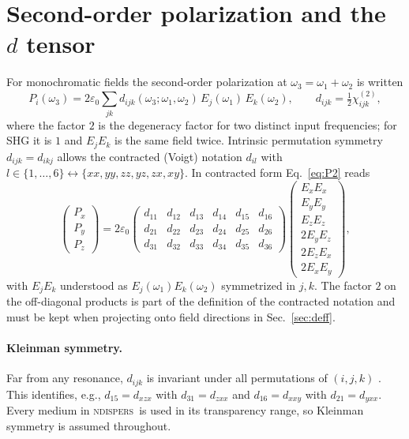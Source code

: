 \documentclass[aps,pra,preprint,amsmath,amssymb,nofootinbib,superscriptaddress]{revtex4-2}
\newcommand{\ndispers}{\textsc{ndispers}}
\begin{document}
\section{Second-order polarization and the $d$ tensor}

For monochromatic fields the second-order polarization at
$\omega_3=\omega_1+\omega_2$ is written \cite{Boyd}
\begin{equation}
  P_i(\omega_3) = 2\varepsilon_0 \sum_{jk} d_{ijk}(\omega_3;\omega_1,\omega_2)\,
  E_j(\omega_1)\,E_k(\omega_2),
  \qquad d_{ijk} = \tfrac12 \chi^{(2)}_{ijk},
  \label{eq:P2}
\end{equation}
where the factor $2$ is the degeneracy factor for two distinct input
frequencies; for SHG it is $1$ and $E_j E_k$ is the same field twice.
Intrinsic permutation symmetry $d_{ijk}=d_{ikj}$ allows the contracted
(Voigt) notation $d_{il}$ with $l \in \{1,\dots,6\} \leftrightarrow
\{xx,yy,zz,yz,zx,xy\}$. In contracted form Eq.~\eqref{eq:P2} reads
\begin{equation}
  \begin{pmatrix} P_x\\P_y\\P_z \end{pmatrix}
  = 2\varepsilon_0
  \begin{pmatrix}
    d_{11}&d_{12}&d_{13}&d_{14}&d_{15}&d_{16}\\
    d_{21}&d_{22}&d_{23}&d_{24}&d_{25}&d_{26}\\
    d_{31}&d_{32}&d_{33}&d_{34}&d_{35}&d_{36}
  \end{pmatrix}
  \begin{pmatrix}
    E_xE_x\\ E_yE_y\\ E_zE_z\\ 2E_yE_z\\ 2E_zE_x\\ 2E_xE_y
  \end{pmatrix},
  \label{eq:contracted}
\end{equation}
with $E_jE_k$ understood as $E_j(\omega_1)E_k(\omega_2)$ symmetrized in
$j,k$. The factor $2$ on the off-diagonal products is part of the
definition of the contracted notation and must be kept when projecting
onto field directions in Sec.~\ref{sec:deff}.

\paragraph*{Kleinman symmetry.}
Far from any resonance, $d_{ijk}$ is invariant under all permutations of
$(i,j,k)$ \cite{Kleinman1962}. This identifies, e.g., $d_{15}=d_{xzx}$
with $d_{31}=d_{zxx}$ and $d_{16}=d_{xxy}$ with $d_{21}=d_{yxx}$. Every
medium in \ndispers\ is used in its transparency range, so Kleinman
symmetry is assumed throughout.
\end{document}
